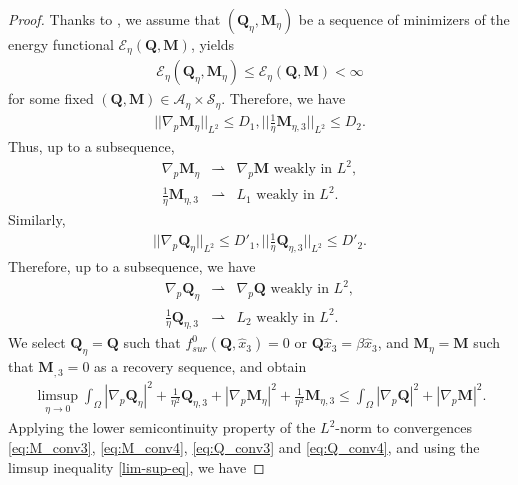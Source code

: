 \documentclass{article}
\def\Qvec{\mathbf{Q}}
\def \Mvec{\mathbf{M}}
\begin{document}
\begin{proof}
Thanks to , we assume that $\left(\Qvec_{\eta}, \Mvec_{\eta}\right)$ be a sequence of minimizers of the energy functional $\mathcal{E}_{\eta}\left(\Qvec, \Mvec\right)$, yields
\begin{eqnarray}
\mathcal{E}_{\eta}\left(\Qvec_{\eta}, \Mvec_{\eta}\right)\le\mathcal{E}_{\eta}\left(\Qvec, \Mvec\right)<\infty\label{eq:bound}
\end{eqnarray}
for some fixed $\left(\Qvec, \Mvec\right)\in \mathcal{A}_{\eta}\times\mathcal{S}_{\eta}$. Therefore, we have
\begin{eqnarray}
||\nabla_p\Mvec_{\eta}||_{L^2}\le D_1, \bigg|\bigg|\frac{1}{\eta}\Mvec_{\eta,3}\bigg|\bigg|_{L^2}\le D_2.\label{eq:M_conv1}
\end{eqnarray}
Thus, up to a subsequence,
\begin{eqnarray}
\nabla_p\Mvec_{\eta}&\rightharpoonup&\nabla_p\Mvec \mbox{ weakly in } L^2,\label{eq:M_conv3}\\
\frac{1}{\eta}\Mvec_{\eta,3}&\rightharpoonup& L_1  \mbox{ weakly in } L^2.\label{eq:M_conv4}
\end{eqnarray}
Similarly,
\begin{eqnarray}
||\nabla_p\Qvec_{\eta}||_{L^2}\le D'_1, \bigg|\bigg|\frac{1}{\eta}\Qvec_{\eta,3}\bigg|\bigg|_{L^2}\le D'_2.\label{eq:Q_conv2}
\end{eqnarray}
Therefore, up to a subsequence, we have
\begin{eqnarray}
\nabla_p\Qvec_{\eta}&\rightharpoonup&\nabla_p\Qvec \mbox{ weakly in } L^2,\label{eq:Q_conv3}\\
\frac{1}{\eta}\Qvec_{\eta,3}&\rightharpoonup& L_2  \mbox{ weakly in } L^2.\label{eq:Q_conv4}
\end{eqnarray}
We select $\Qvec_{\eta}=\Qvec$ such that $f^0_{sur}\left(\Qvec, \hat{x}_3\right)=0$ or $\Qvec\hat{x}_3=\beta\hat{x}_3$, and $\Mvec_{\eta}=\Mvec$ such that $\Mvec_{,3}=0$ as a recovery sequence, and obtain
\begin{eqnarray}
\limsup_{\eta\rightarrow 0}\int_{\Omega}|\nabla_p\Qvec_{\eta}|^2+\frac{1}{\eta^2}\Qvec_{\eta,3}+|\nabla_p\Mvec_{\eta}|^2+\frac{1}{\eta^2}\Mvec_{\eta,3}\le\int_{\Omega}|\nabla_p\Qvec|^2+|\nabla_p\Mvec|^2.\label{lim-sup-eq}
\end{eqnarray}
Applying the lower semicontinuity property of the $L^2$-norm to convergences \eqref{eq:M_conv3}, \eqref{eq:M_conv4}, \eqref{eq:Q_conv3} and \eqref{eq:Q_conv4}, and using the limsup inequality \eqref{lim-sup-eq}, we have

\end{proof}
\end{document}
